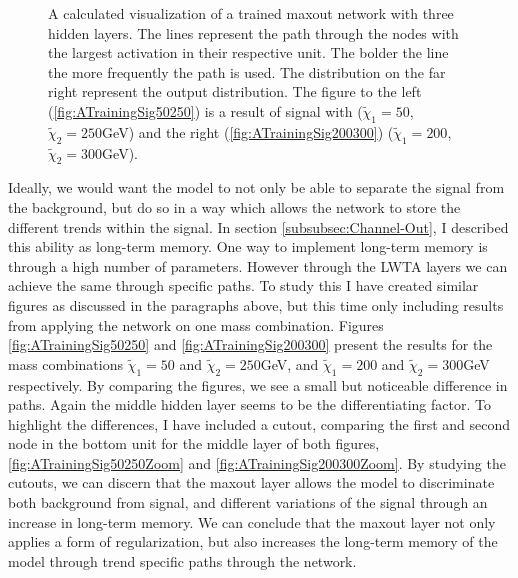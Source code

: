 \begin{figure}
{\begin{subfigure}{.6\textwidth}
    \end{subfigure}
    }
    \caption[A calculated visualization of the activation of a three layer maxout network, after training and displaying
    the results for two signal with each their own mass combination.]{A calculated visualization of a trained maxout network 
    with three hidden layers. The lines represent the path through the nodes with the largest activation in their respective
    unit. The bolder the line the more frequently the path is used. The distribution on the far right represent the output 
    distribution. The figure to the left (\ref{fig:ATrainingSig50250}) is a result of signal with ($\tilde{\chi}_1=50$, 
    $\tilde{\chi}_2=250$GeV) and the right (\ref{fig:ATrainingSig200300}) ($\tilde{\chi}_1=200$, $\tilde{\chi}_2=300$GeV).}
    \label{fig:NetVisSigComp}
\end{figure}
Ideally, we would want the model to not only be able to separate the signal from the background, but do so in 
a way which allows the network to store the different trends within the signal. In section \ref{subsubsec:Channel-Out},
I described this ability as long-term memory. One way to implement long-term memory is through a high number of parameters.
However through the \ac{LWTA} layers we can achieve the same through specific paths. To study this I have created similar 
figures as discussed in the paragraphs above, but this time only including results from applying the network on one mass combination. 
Figures \ref{fig:ATrainingSig50250} and \ref{fig:ATrainingSig200300} present the results for the mass combinations 
$\tilde{\chi}_1=50$ and $\tilde{\chi}_2=250$GeV, and $\tilde{\chi}_1=200$ and $\tilde{\chi}_2=300$GeV respectively.
By comparing the figures, we see a small but noticeable difference in paths. Again the middle hidden layer seems to be 
the differentiating factor. To highlight the differences, I have included a cutout, comparing the first and second node in the bottom unit 
for the middle layer of both figures, \ref{fig:ATrainingSig50250Zoom} and \ref{fig:ATrainingSig200300Zoom}.
By studying the cutouts, we can discern that the maxout layer allows the model to discriminate both background from signal, 
and different variations of the signal through an increase in long-term memory. We can conclude that the maxout layer not only 
applies a form of regularization, but also increases the long-term memory of the model through trend specific paths through the network.\\
